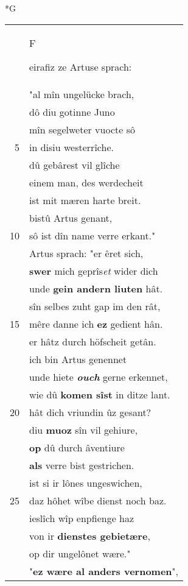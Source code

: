 \documentclass[8pt,a4paper,notitlepage]{article}
\begin{document}
\newpage
\begin{table}[ht]
\begin{minipage}[t]{0.5\linewidth}
\small
\begin{center}*G
\end{center}
\begin{tabular}{rl}
 & \begin{large}F\end{large}eirafiz ze Artuse sprach:\\ 
 & "al mîn ungelücke brach,\\ 
 & dô diu gotinne Juno\\ 
 & mîn segelweter vuocte sô\\ 
5 & in disiu westerrîche.\\ 
 & dû gebârest vil glîche\\ 
 & einem man, des werdecheit\\ 
 & ist mit mæren harte breit.\\ 
 & bistû Artus genant,\\ 
10 & sô ist dîn name verre erkant."\\ 
 & Artus sprach: "er êret sich,\\ 
 & \textbf{swer} mich geprîs\textit{et} wider dich\\ 
 & unde \textbf{gein andern liuten} hât.\\ 
 & sîn selbes zuht gap im den rât,\\ 
15 & mêre danne ich \textbf{ez} gedient hân.\\ 
 & er hâtz durch höfscheit getân.\\ 
 & ich bin Artus genennet\\ 
 & unde hiete \textit{\textbf{ouch}} gerne erkennet,\\ 
 & wie dû \textbf{komen sîst} in ditze lant.\\ 
20 & hât dich vriundin ûz gesant?\\ 
 & diu \textbf{muoz} sîn vil gehiure,\\ 
 & \textbf{op} dû durch âventiure\\ 
 & \textbf{als} verre bist gestrichen.\\ 
 & ist si ir lônes ungeswichen,\\ 
25 & daz hôhet wîbe dienst noch baz.\\ 
 & ieslîch wîp enpfienge haz\\ 
 & von ir \textbf{dienstes gebietære},\\ 
 & op dir ungelônet wære."\\ 
 & "\textbf{ez wære al anders vernomen}",\\ 

\end{tabular}
\end{minipage}
\end{table}
\end{document}
